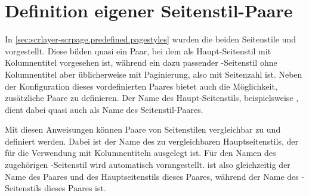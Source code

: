 
\section{Definition eigener Seitenstil-Paare}

In \autoref{sec:scrlayer-scrpage.predefined.pagestyles} wurden die beiden
Seitenstile  und 
vorgestellt. Diese bilden quasi ein Paar, bei dem  als
Haupt-Seitenstil mit Kolumnentitel vorgesehen ist, während
 ein dazu passender -Seitenstil
ohne Kolumnentitel aber üblicherweise mit Paginierung, also mit Seitenzahl
ist. Neben der Konfiguration dieses vordefinierten Paares bietet
 auch die Möglichkeit, zusätzliche Paare zu
definieren. Der Name des Haupt-Seitenstils, beispielsweise
, dient dabei quasi auch als Name des Seitenstil-Paares.


\begin{Declaration}
\end{Declaration}
Mit diesen Anweisungen können Paare von Seitenstilen vergleichbar zu
 und  definiert
werden. Dabei ist  der Name des zu 
vergleichbaren Hauptseitenstils, der für die Verwendung mit Kolumnentiteln
ausgelegt ist. Für den Namen des zugehörigen -Seitenstil wird
 automatisch  vorangestellt.  ist also
gleichzeitig der Name des Paares und des Hauptseitenstils dieses Paares, während
 der Name des -Seitenstils dieses
Paares ist.

